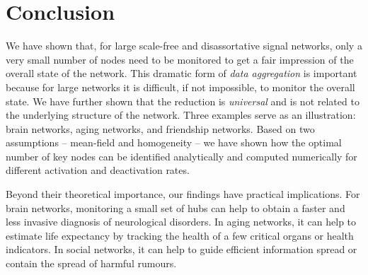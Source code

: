 \documentclass[11pt]{article}
\numberwithin{equation}{section}
\begin{document}

\section{Conclusion}

We have shown that, for large scale-free and disassortative signal networks, only a very small number of nodes need to be monitored to get a fair impression of the overall state of the network. This dramatic form of \emph{data aggregation} is important because for large networks it is difficult, if not impossible, to monitor the overall state. We have further shown that the reduction is \emph{universal} and is not related to the underlying structure of the network. Three examples serve as an illustration: brain networks, aging networks, and friendship networks. Based on two assumptions -- mean-field and homogeneity -- we have shown how the optimal number of key nodes can be identified analytically and computed numerically for different activation and deactivation rates.  

Beyond their theoretical importance, our findings have practical implications. For brain networks, monitoring a small set of hubs can help to obtain a faster and less invasive diagnosis of neurological disorders. In aging networks, it can help to estimate life expectancy by tracking the health of a few critical organs or health indicators. In social networks, it can help to guide efficient information spread or contain the spread of harmful rumours.




\end{document}
